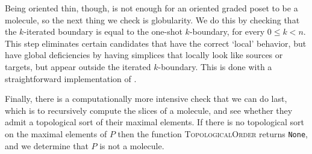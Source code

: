 \documentclass[12pt,a4paper]{article}
\numberwithin{equation}{section}
\begin{document}
\vspace{0.3cm}

Being oriented thin, though, is not enough for an oriented graded poset to be a molecule, so the next thing we check is globularity. We do this by checking that the $k$-iterated boundary is equal to the one-shot $k$-boundary, for every $0 \leq k < n$. This step eliminates certain candidates that have the correct `local' behavior, but have global deficiencies by having simplices that locally look like sources or targets, but appear outside the iterated $k$-boundary. This is done with a straightforward implementation of .

Finally, there is a computationally more intensive check that we can do last, which is to recursively compute the slices of a molecule, and see whether they admit a topological sort of their maximal elements. If there is no topological sort on the maximal elements of $P$ then the function \textsc{TopologicalOrder} returns \texttt{None}, and we determine that $P$ is not a molecule.
\end{document}
